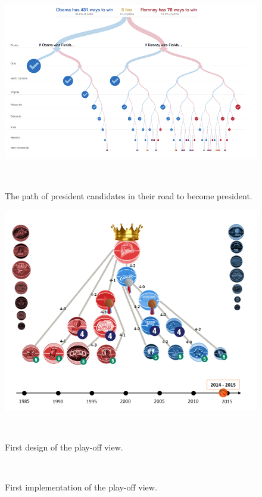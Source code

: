 \documentclass[chi_draft]{sigchi}
\begin{document}
\begin{figure}
\centering
  \includegraphics[width=1.0\columnwidth]{figures/presidentcandidatesvisualization}
  \caption{The path of president candidates in their road to become president.}~\label{fig:whitehousepath}
\end{figure}

\begin{figure}
\centering
  \includegraphics[width=1.0\columnwidth]{figures/playoffviewfirstdesign}
  \caption{First design of the play-off view.}~\label{fig:firstdesignplayoffview}
\end{figure}

\begin{figure}
\centering
  \missingfigure{}
  \caption{First implementation of the play-off view.}~\label{fig:firstimplementationplayoffview}
\end{figure}
\end{document}
